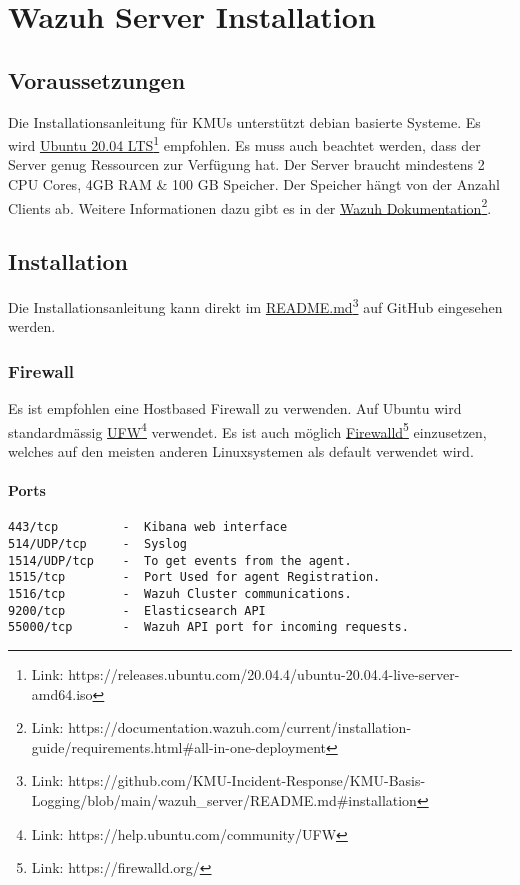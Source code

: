 \chapter{Wazuh Server Installation}

\section{Voraussetzungen}
Die Installationsanleitung für KMUs unterstützt debian basierte Systeme.
Es wird \href{https://releases.ubuntu.com/20.04.4/ubuntu-20.04.4-live-server-amd64.iso}{Ubuntu 20.04 LTS}\footnote{Link: https://releases.ubuntu.com/20.04.4/ubuntu-20.04.4-live-server-amd64.iso} empfohlen.
Es muss auch beachtet werden, dass der Server genug Ressourcen zur Verfügung hat.
Der Server braucht mindestens 2 CPU Cores, 4GB RAM \& 100 GB Speicher.
Der Speicher hängt von der Anzahl Clients ab.
Weitere Informationen dazu gibt es in der \href{https://documentation.wazuh.com/current/installation-guide/requirements.html\#all-in-one-deployment}{Wazuh Dokumentation}\footnote{Link: https://documentation.wazuh.com/current/installation-guide/requirements.html\#all-in-one-deployment}.

\section{Installation}
Die Installationsanleitung kann direkt im \href{https://github.com/KMU-Incident-Response/KMU-Basis-Logging/blob/main/wazuh\_server/README.md\#installation}{README.md}\footnote{Link: https://github.com/KMU-Incident-Response/KMU-Basis-Logging/blob/main/wazuh\_server/README.md\#installation} auf GitHub eingesehen werden.


\subsection{Firewall}
Es ist empfohlen eine Hostbased Firewall zu verwenden.
Auf Ubuntu wird standardmässig \href{https://help.ubuntu.com/community/UFW}{UFW}\footnote{Link: https://help.ubuntu.com/community/UFW} verwendet.
Es ist auch möglich \href{https://firewalld.org/}{Firewalld}\footnote{Link: https://firewalld.org/} einzusetzen, welches auf den meisten anderen Linuxsystemen als default verwendet wird.

\subsubsection{Ports}
\begin{lstlisting}
443/tcp         -  Kibana web interface
514/UDP/tcp     -  Syslog
1514/UDP/tcp    -  To get events from the agent.
1515/tcp        -  Port Used for agent Registration.
1516/tcp        -  Wazuh Cluster communications.
9200/tcp        -  Elasticsearch API
55000/tcp       -  Wazuh API port for incoming requests.
\end{lstlisting}




